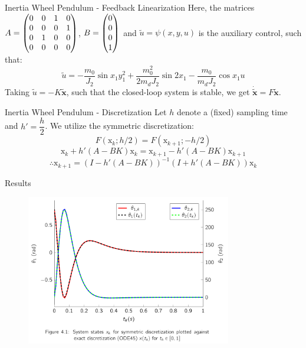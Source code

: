 \documentclass{beamer}
\begin{document}
\begin{frame}{Inertia Wheel Pendulum - Feedback Linearization}
Here, the matrices $A = \begin{pmatrix} 0 & 0 & 1 & 0 \\ 0 & 0 & 0 & 1 \\ 0 & 1 & 0 & 0 \\ 0 & 0 & 0 & 0 \end{pmatrix}$, $B = \begin{pmatrix}0 \\ 0 \\ 0 \\ 1\end{pmatrix}$ and
$\tilde{u} = \psi (x, y, u)$ is the auxiliary control, such that:
\begin{equation}
    \tilde{u} = -\dfrac{m_0}{J_2} \sin{x_1}y_1^2 + \dfrac{m_0^2}{2m_d J_2}\sin{2x_1} - \dfrac{m_0}{m_d J_2} \cos{x_1} u
\end{equation}
Taking $\tilde{u} = -K \tilde{\textbf{x}}$, such that the closed-loop system is stable, we get $\dot{\tilde{\textbf{x}}} = F \tilde{\textbf{x}}$.

\end{frame}

\begin{frame}{Inertia Wheel Pendulum - Discretization}
  Let $h$ denote a (fixed) sampling time and $h' = \dfrac{h}{2}$. We utilize the symmetric discretization:
\[
F(\text{x}_k; h/2) = F(\text{x}_{k+1}; -h/2)
\]
\[\text{x}_k + h' (A-BK) \text{x}_k = \text{x}_{k+1} - h'(A-BK) \text{x}_{k+1} \]
\begin{equation}
    \therefore \text{x}_{k+1} = {(I - h'(A-BK))}^{-1}(I + h'(A-BK)) \text{x}_k
\end{equation}
  
\end{frame}

\begin{frame}{Results}
  \begin{figure}[h]
    \centering
    \includegraphics[width=0.8\textwidth]{../Figures/ex1_states.png}
  \end{figure}
\end{frame}
\end{document}
